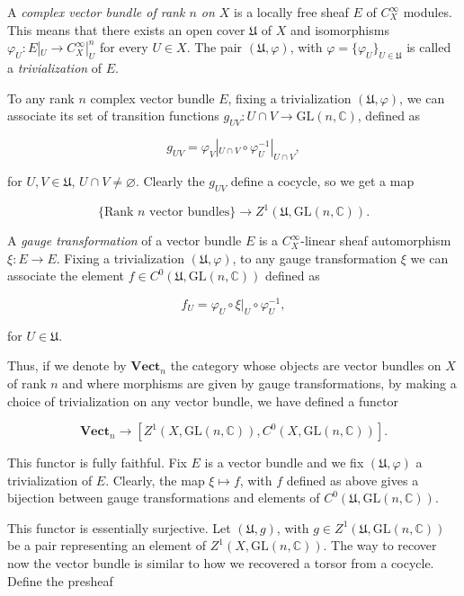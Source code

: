 \documentclass[]{article}
\begin{document}
A \emph{complex vector bundle of rank \(n\) on \(X\)} is a locally free
sheaf \(E\) of \(C^\infty_X\) modules. This means that there exists an
open cover \(\mathfrak{U}\) of \(X\) and isomorphisms
\(\varphi_U: E|_U \rightarrow C^\infty_X|_U ^n\) for every \(U \in X\).
The pair \((\mathfrak{U},\varphi)\), with
\(\varphi=\{\varphi_U\}_{U\in \mathfrak{U}}\) is called a
\emph{trivialization} of \(E\).

To any rank \(n\) complex vector bundle \(E\), fixing a trivialization
\((\mathfrak{U},\varphi)\), we can associate its set of transition
functions \(g_{UV}:U \cap V \rightarrow \mathrm{GL}(n,\mathbb{C})\),
defined as

\[
g_{UV}=\varphi_V|_{U\cap V} \circ \varphi_U^{-1}|_{U\cap V},
\]

for \(U,V \in \mathfrak{U}\), \(U\cap V \neq \varnothing\). Clearly the
\(g_{UV}\) define a cocycle, so we get a map

\[
\{ \text{Rank $n$ vector bundles} \} \longrightarrow Z^1(\mathfrak{U},\mathrm{GL}(n,\mathbb{C})).
\]

A \emph{gauge transformation} of a vector bundle \(E\) is a
\(C^\infty_X\)-linear sheaf automorphism \(\xi:E\rightarrow E\). Fixing
a trivialization \((\mathfrak{U},\varphi)\), to any gauge transformation
\(\xi\) we can associate the element
\(f\in C^0(\mathfrak{U},\mathrm{GL}(n,\mathbb{C}))\) defined as

\[
f_U=\varphi_U \circ \xi|_U \circ \varphi_U^{-1},
\]

for \(U\in \mathfrak{U}\).

Thus, if we denote by \(\mathbf{Vect}_n\) the category whose objects are
vector bundles on \(X\) of rank \(n\) and where morphisms are given by
gauge transformations, by making a choice of trivialization on any
vector bundle, we have defined a functor

\[
\mathbf{Vect}_n \longrightarrow [Z^1(X,\mathrm{GL}(n,\mathbb{C})), C^0(X,\mathrm{GL}(n,\mathbb{C}))].
\]

This functor is fully faithful. Fix \(E\) is a vector bundle and we fix
\((\mathfrak{U},\varphi)\) a trivialization of \(E\). Clearly, the map
\(\xi\mapsto f\), with \(f\) defined as above gives a bijection between
gauge transformations and elements of
\(C^0(\mathfrak{U},\mathrm{GL}(n,\mathbb{C}))\).

This functor is essentially surjective. Let \((\mathfrak{U},g)\), with
\(g \in Z^1(\mathfrak{U},\mathrm{GL}(n,\mathbb{C}))\) be a pair
representing an element of \(Z^1(X,\mathrm{GL}(n,\mathbb{C}))\). The way
to recover now the vector bundle is similar to how we recovered a torsor
from a cocycle. Define the presheaf
\end{document}
